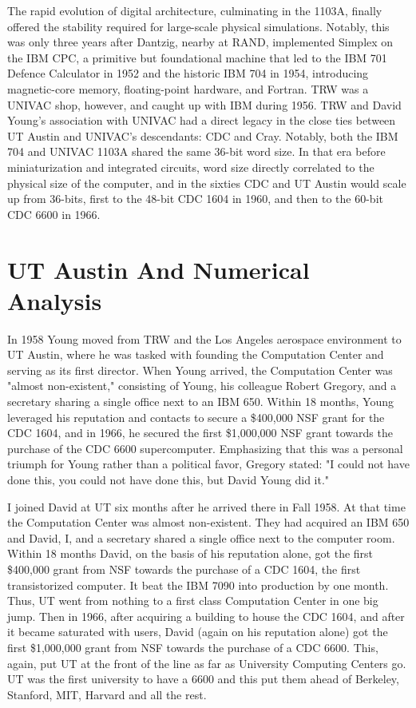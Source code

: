 The rapid evolution of digital architecture, culminating in the 1103A, finally offered the stability required for large-scale physical simulations. Notably, this was only three years after Dantzig, nearby at RAND, implemented Simplex on the IBM CPC, a primitive but foundational machine that led to the IBM 701 Defence Calculator in 1952 and the historic IBM 704 in 1954, introducing magnetic-core memory, floating-point hardware, and Fortran. TRW was a UNIVAC shop, however, and caught up with IBM during 1956. TRW and David Young’s association with UNIVAC had a direct legacy in the close ties between UT Austin and UNIVAC’s descendants: CDC and Cray. Notably, both the IBM 704 and UNIVAC 1103A shared the same 36-bit word size. In that era before miniaturization and integrated circuits, word size directly correlated to the physical size of the computer, and in the sixties CDC and UT Austin would scale up from 36-bits, first to the 48-bit CDC 1604 in 1960, and then to the 60-bit CDC 6600 in 1966. 

\section{UT Austin And Numerical Analysis}

In 1958 Young moved from TRW and the Los Angeles aerospace environment to UT Austin, where he was tasked with founding the Computation Center and serving as its first director. When Young arrived, the Computation Center was "almost non-existent," consisting of Young, his colleague Robert Gregory, and a secretary sharing a single office next to an IBM 650. Within 18 months, Young leveraged his reputation and contacts to secure a \$400,000 NSF grant for the CDC 1604, and in 1966, he secured the first \$1,000,000 NSF grant towards the purchase of the CDC 6600 supercomputer. Emphasizing that this was a personal triumph for Young rather than a political favor, Gregory stated: "I could not have done this, you could not have done this, but David Young did it."

I joined David at UT six months after he arrived there in Fall 1958. At that time the Computation Center was almost non-existent. They had acquired an IBM 650 and David, I, and a secretary shared a single office next to the computer room. Within 18 months David, on the basis of his reputation alone, got the first \$400,000 grant from NSF towards the purchase of a CDC 1604, the first transistorized computer. It beat the IBM 7090 into production by one month. Thus, UT went from nothing to a first class Computation Center in one big jump. Then in 1966, after acquiring a building to house the CDC 1604, and after it became saturated with users, David (again on his reputation alone) got the first \$1,000,000 grant from NSF towards the purchase of a CDC 6600. This, again, put UT at the front of the line as far as University Computing Centers go. UT was the first university to have a 6600 and this put them ahead of Berkeley, Stanford, MIT, Harvard and all the rest.

